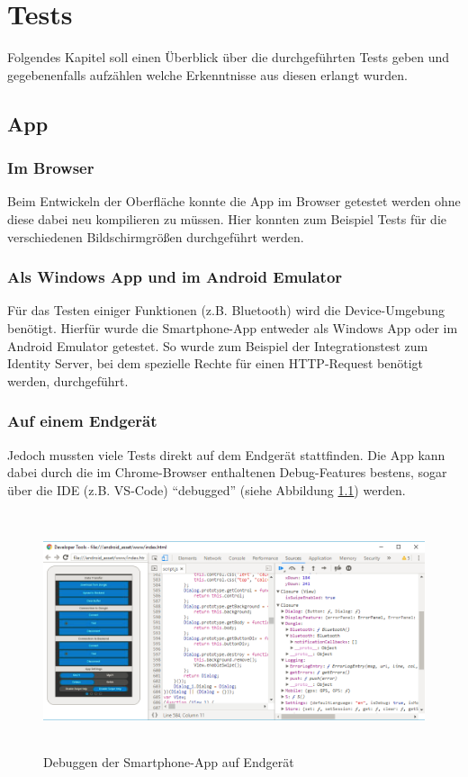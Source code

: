 \chapter{Tests}
\label{sec:test}
Folgendes Kapitel soll einen Überblick über die durchgeführten Tests geben und gegebenenfalls aufzählen welche Erkenntnisse aus diesen erlangt wurden.

\section{App}
\label{sec:appTest}

\subsection{Im Browser}

Beim Entwickeln der Oberfläche konnte die App im Browser getestet werden ohne diese dabei neu kompilieren zu müssen. Hier konnten zum Beispiel Tests für die verschiedenen Bildschirmgrößen durchgeführt werden.

\subsection{Als Windows App und im Android Emulator}

Für das Testen einiger Funktionen (z.B. Bluetooth) wird die Device-Umgebung benötigt. Hierfür wurde die Smartphone-App entweder als Windows App oder im Android Emulator getestet. So wurde zum Beispiel der Integrationstest zum Identity Server, bei dem spezielle Rechte für einen HTTP-Request benötigt werden, durchgeführt.

\subsection{Auf einem Endgerät}

Jedoch mussten viele Tests direkt auf dem Endgerät stattfinden. Die App kann dabei durch die im Chrome-Browser enthaltenen Debug-Features bestens, sogar über die IDE (z.B. VS-Code) \enquote{debugged} (siehe Abbildung \ref{fig:App_Debug_Device}) werden.

\begin{figure}[H]
	\begin{center}
		\includegraphics[height=7cm,keepaspectratio]{./img/App_Debug_Device}
		\caption{Debuggen der Smartphone-App auf Endgerät}
		\label{fig:App_Debug_Device}
	\end{center}
\end{figure}

